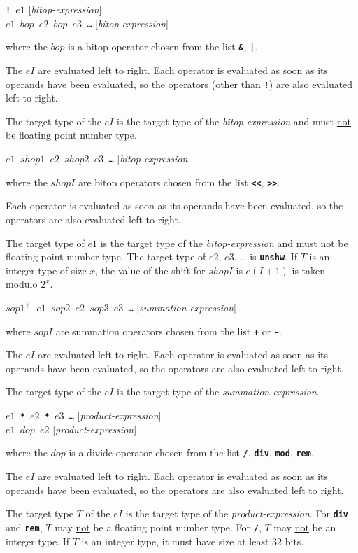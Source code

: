 \documentclass[12pt]{article}
\newcommand{\TT}[1]{{\tt \bfseries #1}}
\newcommand{\QMARK}{{$^{\,\mbox{\footnotesize ?}}$}}
\newenvironment{indpar}[1][0.3in]%
	{\begin{list}{}%
		     {\setlength{\itemsep}{0in}%
		      \setlength{\topsep}{0in}%
		      \setlength{\parsep}{1ex}%
		      \setlength{\labelwidth}{#1}%
		      \setlength{\leftmargin}{#1}%
		      \addtolength{\leftmargin}{\labelsep}}%
	 \item}%
	{\end{list}}
\begin{document}
\TT{! $e1$}
\hfill [{\em bitop-expression}] \\
\TT{$e1$ $bop$ $e2$ $bop$ $e3$ \ldots{}}
\hfill [{\em bitop-expression}]
\begin{indpar}
where the $bop$ is a bitop operator chosen from the list
\TT{\&}, \TT{|}.

The $eI$ are evaluated left to right.
Each operator is evaluated as soon as its operands have
been evaluated, so the operators (other than \TT{!}) are
also evaluated left to right.

The target type of the $eI$ is the target type of the
{\em bitop-expression} and must \underline{not} be floating
point number type.
\end{indpar}

\TT{$e1$ $shop1$ $e2$ $shop2$ $e3$ \ldots{}}
\hfill [{\em bitop-expression}]
\begin{indpar}
where the $shopI$ are bitop operators chosen from the list
\TT{<{}<}, \TT{>{}>}.

Each operator is evaluated as soon as its operands have
been evaluated, so the operators are
also evaluated left to right.

The target type of $e1$ is the target type of the
{\em bitop-expression} and must \underline{not} be floating
point number type.
The target type of $e2$, $e3$, \ldots{} is \TT{unshw}.
If $T$ is an integer type of size $x$,
the value of the shift for $shopI$
is $e(I+1)$ is taken modulo $2^x$.
\end{indpar}

\TT{$sop1$\QMARK{} $e1$ $sop2$ $e2$ $sop3$ $e3$ \ldots{}}
\hfill [{\em summation-expression}]
\begin{indpar}
where $sopI$ are summation operators chosen from the list
\TT{+} or \TT{-}.

The $eI$ are evaluated left to right.
Each operator is evaluated as soon as its operands have
been evaluated, so the operators are
also evaluated left to right.

The target type of the $eI$ is the target type of the
{\em summation-expression}.
\end{indpar}

\TT{$e1$ * $e2$ * $e3$ \ldots{}}
\hfill [{\em product-expression}] \\
\TT{$e1$ $dop$ $e2$}
\hfill [{\em product-expression}]
\begin{indpar}
where the $dop$ is a divide operator chosen from the list
\TT{/}, \TT{div}, \TT{mod}, \TT{rem}.

The $eI$ are evaluated left to right.
Each operator is evaluated as soon as its operands have
been evaluated, so the operators are
also evaluated left to right.

The target type $T$ of the $eI$ is the target type of the
{\em product-expression}.  For \TT{div} and \TT{rem}, $T$ may
\underline{not} be a floating point number type.
For \TT{/}, $T$ may \underline{not} be an integer type.
If $T$ is an integer type, it must have size at least 32 bits.

\end{indpar}
\end{document}
